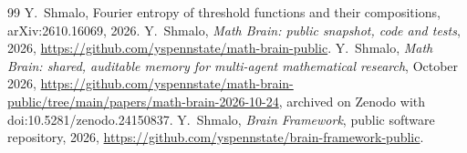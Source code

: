 \documentclass[11pt]{amsart}
\theoremstyle{remark}
\begin{document}
\begin{thebibliography}{99}
 Y.~Shmalo, Fourier entropy of threshold functions and their compositions,
arXiv:2610.16069, 2026.
 Y.~Shmalo, \emph{Math Brain: public snapshot, code and tests}, 2026,
\url{https://github.com/yspennstate/math-brain-public}.
 Y.~Shmalo, \emph{Math Brain: shared, auditable memory for multi-agent mathematical research},
October 2026, \url{https://github.com/yspennstate/math-brain-public/tree/main/papers/math-brain-2026-10-24}, archived on Zenodo with doi:10.5281/zenodo.24150837.
 Y.~Shmalo, \emph{Brain Framework}, public software repository, 2026,
\url{https://github.com/yspennstate/brain-framework-public}.
\end{thebibliography}
\end{document}
